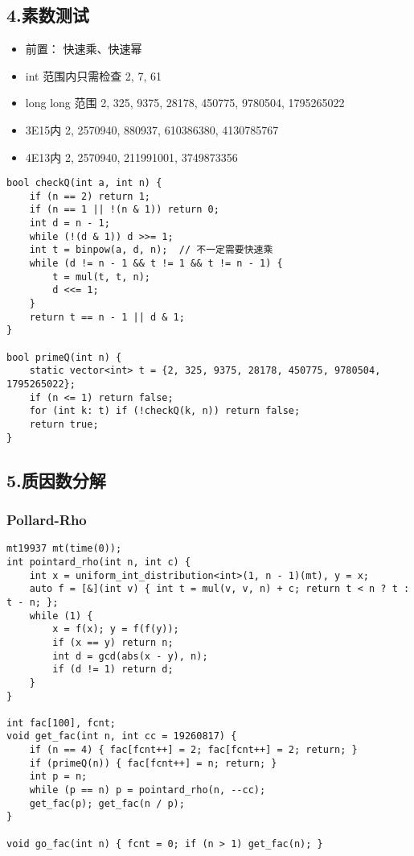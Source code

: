\documentclass[]{article}
\providecommand{\tightlist}{%
  \setlength{\itemsep}{0pt}\setlength{\parskip}{0pt}}
\begin{document}
\hypertarget{ux7d20ux6570ux6d4bux8bd5}{%
\subsection{4.素数测试}\label{ux7d20ux6570ux6d4bux8bd5}}

\begin{itemize}
\tightlist
\item
  前置： 快速乘、快速幂
\item
  int 范围内只需检查 2, 7, 61
\item
  long long 范围 2, 325, 9375, 28178, 450775, 9780504, 1795265022
\item
  3E15内 2, 2570940, 880937, 610386380, 4130785767
\item
  4E13内 2, 2570940, 211991001, 3749873356
\end{itemize}

\begin{verbatim}
bool checkQ(int a, int n) {
    if (n == 2) return 1;
    if (n == 1 || !(n & 1)) return 0;
    int d = n - 1;
    while (!(d & 1)) d >>= 1;
    int t = binpow(a, d, n);  // 不一定需要快速乘
    while (d != n - 1 && t != 1 && t != n - 1) {
        t = mul(t, t, n);
        d <<= 1;
    }
    return t == n - 1 || d & 1;
}

bool primeQ(int n) {
    static vector<int> t = {2, 325, 9375, 28178, 450775, 9780504, 1795265022};
    if (n <= 1) return false;
    for (int k: t) if (!checkQ(k, n)) return false;
    return true;
}
\end{verbatim}

\hypertarget{ux8d28ux56e0ux6570ux5206ux89e3}{%
\subsection{5.质因数分解}\label{ux8d28ux56e0ux6570ux5206ux89e3}}

\hypertarget{pollard-rho}{%
\subsubsection{Pollard-Rho}\label{pollard-rho}}

\begin{verbatim}
mt19937 mt(time(0));
int pointard_rho(int n, int c) {
    int x = uniform_int_distribution<int>(1, n - 1)(mt), y = x;
    auto f = [&](int v) { int t = mul(v, v, n) + c; return t < n ? t : t - n; };
    while (1) {
        x = f(x); y = f(f(y));
        if (x == y) return n;
        int d = gcd(abs(x - y), n);
        if (d != 1) return d;
    }
}

int fac[100], fcnt;
void get_fac(int n, int cc = 19260817) {
    if (n == 4) { fac[fcnt++] = 2; fac[fcnt++] = 2; return; }
    if (primeQ(n)) { fac[fcnt++] = n; return; }
    int p = n;
    while (p == n) p = pointard_rho(n, --cc);
    get_fac(p); get_fac(n / p);
}

void go_fac(int n) { fcnt = 0; if (n > 1) get_fac(n); }
\end{verbatim}
\end{document}
